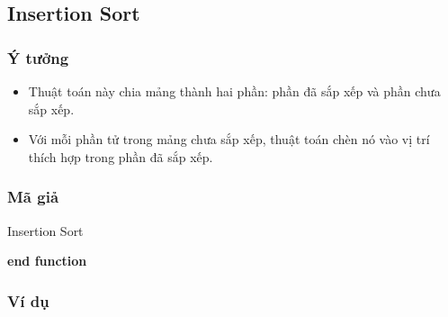 \subsection{Insertion Sort}


\subsubsection{Ý tưởng}

\begin{itemize}
    \item Thuật toán này chia mảng thành hai phần: phần đã sắp xếp và 
    phần chưa sắp xếp.
    \item Với mỗi phần tử trong mảng chưa sắp xếp, thuật toán chèn nó 
    vào vị trí thích hợp trong phần đã sắp xếp. 
\end{itemize}

\subsubsection{Mã giả}

\begin{algorithm}[H]
\caption{Insertion Sort}
\textbf{end function}
\end{algorithm}

\subsubsection{Ví dụ}

